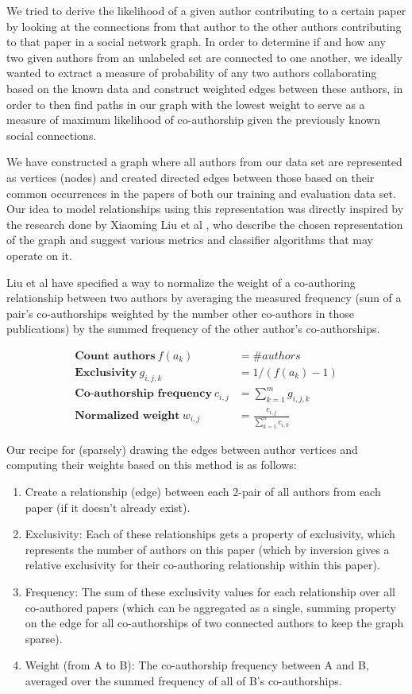 
We tried to derive the likelihood of a given author contributing to a certain paper by looking at the connections from that author to the other authors contributing to that paper in a social network graph.
In order to determine if and how any two given authors from an unlabeled set are connected to one another, we ideally wanted to extract a measure of probability of any two authors collaborating based on the known data and construct weighted edges between these authors, in order to then find paths in our graph with the lowest weight to serve as a measure of maximum likelihood of co-authorship given the previously known social connections.

We have constructed a graph where all authors from our data set are represented as vertices (nodes) and created directed edges between those based on their common occurrences in the papers of both our training and evaluation data set.
Our idea to model relationships using this representation was directly inspired by the research done by Xiaoming Liu et al \cite{liu2005co}, who describe the chosen representation of the graph and suggest various metrics and classifier algorithms that may operate on it.

Liu et al have specified a way to normalize the weight of a co-authoring relationship between two authors by averaging the measured frequency (sum of a pair's co-authorships weighted by the number other co-authors in those publications) by the summed frequency of the other author's co-authorships.

\begin{align*}
\textbf{Count authors}~
	f(a_k) &= \#authors \\
\textbf{Exclusivity}~
	g_{i,j,k} &= 1 / (f(a_k)-1) \\
\textbf{Co-authorship frequency}~
	c_{i,j} &= \sum_{k=1}^{m} g_{i,j,k} \\
\textbf{Normalized weight}~
	w_{i,j} &= \frac{c_{i,j}}{\sum_{k=1}^{n} c_{i,k}}
\end{align*}

Our recipe for (sparsely) drawing the edges between author vertices and computing their weights based on this method is as follows:


\begin{enumerate}
  \item Create a relationship (edge) between each 2-pair of all authors from each paper (if it doesn't already exist).
  \item Exclusivity: Each of these relationships gets a property of exclusivity, which represents the number of authors on this paper (which by inversion gives a relative exclusivity for their co-authoring relationship within this paper).
  \item Frequency: The sum of these exclusivity values for each relationship over all co-authored papers (which can be aggregated as a single, summing property on the edge for all co-authorships of two connected authors to keep the graph sparse).
  \item Weight (from A to B): The co-authorship frequency between A and B, averaged over the summed frequency of all of B's co-authorships.
\end{enumerate}

